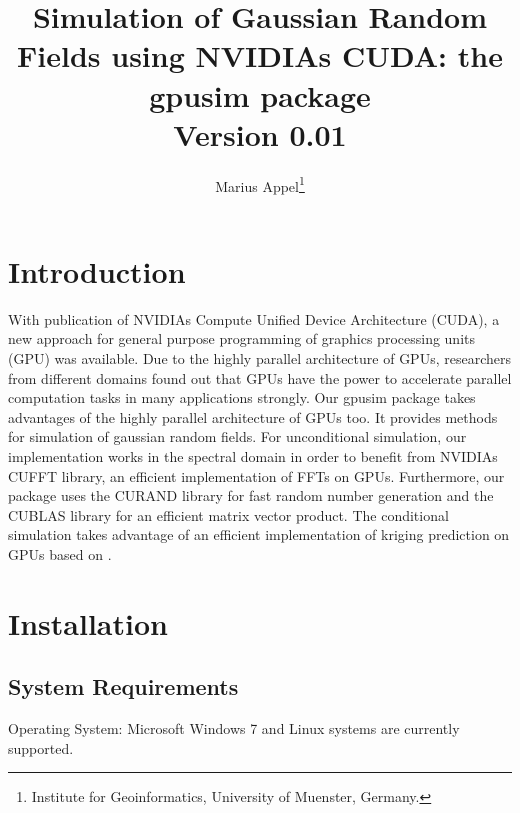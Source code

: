 \documentclass[12pt,oneside,a4paper]{article}
\begin{document}
\title{
Simulation of Gaussian Random Fields using NVIDIAs CUDA: the \textbf{gpusim} package \\
Version 0.01
\vspace{1in}}

\author{
Marius Appel\footnote{Institute for Geoinformatics, University of Muenster, Germany.} \\
\vspace*{\fill}}

\maketitle

\newpage


\tableofcontents

\newpage

\section{Introduction}
With publication of NVIDIAs Compute Unified Device Architecture (CUDA), a new approach for general purpose programming of graphics processing units (GPU) was available. Due to the highly parallel architecture of GPUs, researchers from different domains found out that GPUs have the power to accelerate parallel computation tasks in many applications strongly. 
Our gpusim package takes advantages of the highly parallel architecture of GPUs too. It provides methods for simulation of gaussian random fields. For unconditional simulation, our implementation works in the spectral domain in order to benefit from NVIDIAs CUFFT library, an efficient implementation of FFTs on GPUs. Furthermore, our package uses the CURAND library for fast random number generation and the CUBLAS library for an efficient matrix vector product. The conditional simulation takes advantage of an efficient implementation of kriging prediction on GPUs based on \cite{srinivasan:kriging}.


\section{Installation}
\subsection{System Requirements}

Operating System: Microsoft Windows 7 and Linux systems are currently supported.
 
\end{document}
